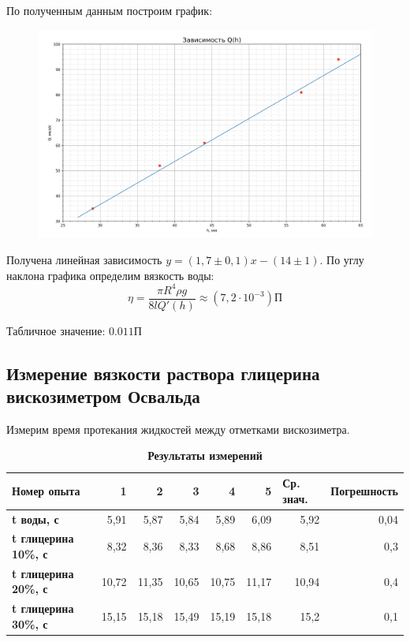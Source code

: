 \documentclass[11pt]{article}
\begin{document}
\begin{enumerate}
    По полученным данным построим график:

    \begin{figure}[H]
    \centering
    \captionsetup{justification=centering}
    \includegraphics[width=\textwidth]{Graf1}
    \caption{}
    \end{figure}

    Получена линейная зависимость $y = (1,7\pm 0,1)x - (14\pm1)$. По углу наклона графика определим вязкость воды:
    \[ \eta = \frac{\pi R^4 \rho g}{8lQ'(h)} \approx (7,2\cdot 10^{-3})П\]

    Табличное значение: $0.011 П$
\subsection{Измерение вязкости раствора глицерина вискозиметром Освальда}

    Измерим время протекания жидкостей между отметками вискозиметра.

    \begin{table}[H]
    \centering
    \caption {\textbf{Результаты измерений}}
    \begin{tabular}{|l|r|r|r|r|r|r|r|}
    \hline
    \textbf{Номер опыта}         & 1     & 2     & 3     & 4     & 5     & \multicolumn{1}{l|}{Ср. знач.} & \multicolumn{1}{l|}{Погрешность} \\ \hline
    \textbf{t воды, с}           & 5,91  & 5,87  & 5,84  & 5,89  & 6,09  & 5,92                           & 0,04                             \\ \hline
    \textbf{t глицерина 10\%, с} & 8,32  & 8,36  & 8,33  & 8,68  & 8,86  & 8,51                           & 0,3                              \\ \hline
    \textbf{t глицерина 20\%, с} & 10,72 & 11,35 & 10,65 & 10,75 & 11,17 & 10,94                          & 0,4                              \\ \hline
    \textbf{t глицерина 30\%, с} & 15,15 & 15,18 & 15,49 & 15,19 & 15,18 & 15,2                           & 0,1                              \\ \hline
    \end{tabular}
    \end{table}


\end{enumerate}
\end{document}
